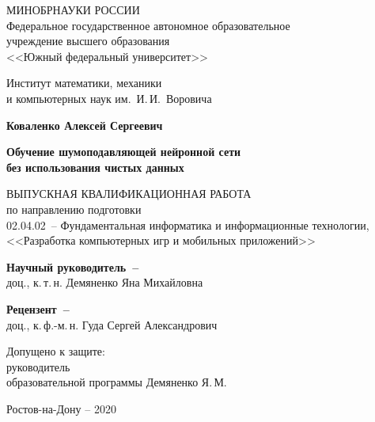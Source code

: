 


\thispagestyle{empty}
\begin{singlespacing} 
\begin{center}

МИНОБРНАУКИ РОССИИ\\ [12pt]
Федеральное государственное автономное образовательное\\
учреждение высшего образования\\
<<Южный федеральный университет>>

\vspace{\baselineskip}
Институт математики, механики\\
и компьютерных наук им.~И.\,И.~Воровича


\vfill
\textbf{Коваленко Алексей Сергеевич}

\vspace{15mm}
{\bf Обучение шумоподавляющей нейронной сети \\без использования чистых данных }

\vspace{15mm}
ВЫПУСКНАЯ КВАЛИФИКАЦИОННАЯ РАБОТА\\
по направлению подготовки\\
02.04.02~-- Фундаментальная информатика и информационные технологии,\\
<<Разработка компьютерных игр и мобильных приложений>>

\vspace{10mm}
\textbf{Научный руководитель~--}\\
 доц., к.\,т.\,н. Демяненко Яна Михайловна

\vspace{7mm}
\textbf{Рецензент~--}\\
доц., к.\,ф.-м.\,н. Гуда Сергей Александрович


\vspace{15mm}

\noindent
\begin{flushleft}
Допущено к защите:\\
руководитель \\
образовательной программы \underline{\hspace*{65mm}} Демяненко Я.\,М.
\end{flushleft}




\vfill
Ростов-на-Дону -- 2020

\end{center} 

\singlespacing
\end{singlespacing}